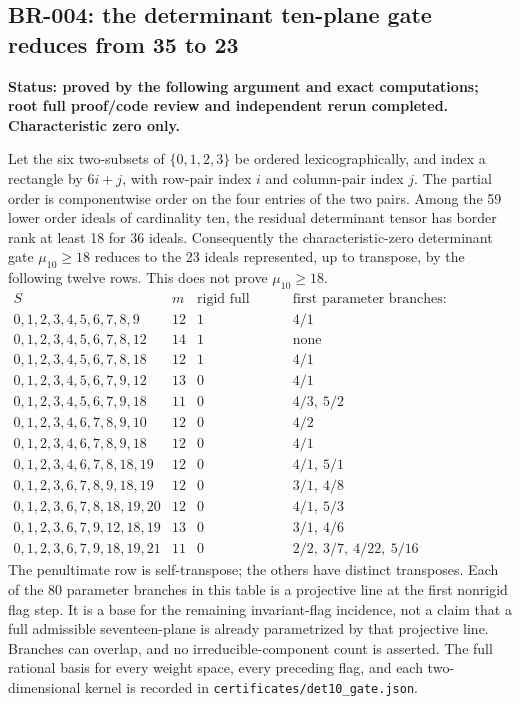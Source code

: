 \subsection*{BR-004: the determinant ten-plane gate reduces from 35 to 23}
\textbf{Status: proved by the following argument and exact computations;
root full proof/code review and independent rerun completed.  Characteristic zero only.}

Let the six two-subsets of $\{0,1,2,3\}$ be ordered lexicographically,
and index a rectangle by $6i+j$, with row-pair index $i$ and column-pair
index $j$.  The partial order is componentwise order on the four entries
of the two pairs.  Among the 59 lower order ideals of cardinality ten,
the residual determinant tensor has border rank at least 18 for 36
ideals.  Consequently the characteristic-zero determinant gate
$\mu_{10}\ge18$ reduces to the 23 ideals represented, up to transpose,
by the following twelve rows.  This does not prove $\mu_{10}\ge18$.
\[
\begin{array}{l|r|r|l}
 S&m&\text{rigid full spaces}&\text{first parameter branches: depth/count}\\\hline
0,1,2,3,4,5,6,7,8,9&12&1&4/1\\
0,1,2,3,4,5,6,7,8,12&14&1&\text{none}\\
0,1,2,3,4,5,6,7,8,18&12&1&4/1\\
0,1,2,3,4,5,6,7,9,12&13&0&4/1\\
0,1,2,3,4,5,6,7,9,18&11&0&4/3,\ 5/2\\
0,1,2,3,4,6,7,8,9,10&12&0&4/2\\
0,1,2,3,4,6,7,8,9,18&12&0&4/1\\
0,1,2,3,4,6,7,8,18,19&12&0&4/1,\ 5/1\\
0,1,2,3,6,7,8,9,18,19&12&0&3/1,\ 4/8\\
0,1,2,3,6,7,8,18,19,20&12&0&4/1,\ 5/3\\
0,1,2,3,6,7,9,12,18,19&13&0&3/1,\ 4/6\\
0,1,2,3,6,7,9,18,19,21&11&0&2/2,\ 3/7,\ 4/22,\ 5/16
\end{array}
\]
The penultimate row is self-transpose; the others have distinct transposes.
Each of the 80 parameter branches in this table is a projective line at
the first nonrigid flag step.  It is a base for the remaining invariant-flag
incidence, not a claim that a full admissible seventeen-plane is already
parametrized by that projective line.  Branches can overlap, and no
irreducible-component count is asserted.  The full rational basis for every
weight space, every preceding flag, and each two-dimensional kernel is
recorded in \texttt{certificates/det10\_gate.json}.

